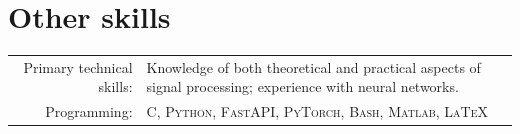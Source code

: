 \documentclass[a4paper,11pt]{article}
\begin{document}

    \vspace{25pt}

    \section{Other skills}

    \begin{tabular}{rp{11cm}}
  	Primary technical skills:  & Knowledge of both theoretical and practical aspects of signal processing; experience with neural networks.
    \vspace{5pt}\\
  	Programming:       &  \textsc{C, Python, FastAPI, PyTorch, Bash, Matlab, \LaTeX}  \vspace{5pt}\\

    \end{tabular}


  \newpage

  \begin{bibunit}
    \renewcommand\refname{Publications: Science}

    \nocite{
      aziznejadMeasuringComplexityLearning2023,
      goujonStableParametrizationContinuous2022,
      camposLearningContinuousPiecewiseLinear2022,
      bohraLearningActivationFunctions2020,
      aziznejadDeepNeuralNetworks2020,
      djelouahNeuralInterFrameCompression2019,
      camposContentAdaptiveOptimization2019}

  \end{bibunit}

  \vspace{20pt}

  \begin{bibunit}
    \renewcommand\refname{Publications: Philosophy}

    \nocite{
      camposMahayanaBuddhistEthicsWork-in-Progress,
      camposWrongnessKillingNonHuman2018} %

  \end{bibunit}
\end{document}
